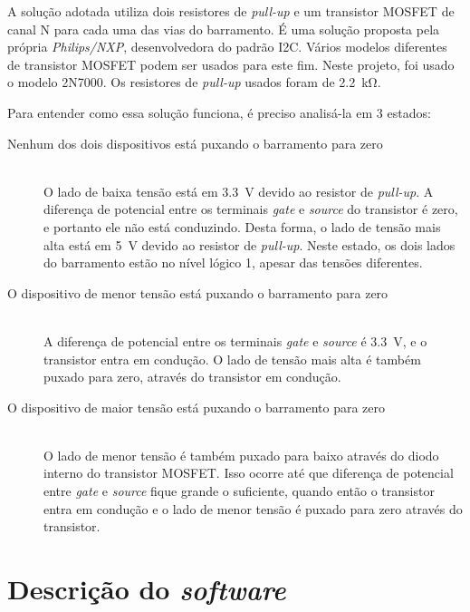 \documentclass[brazil,pagestart=firstchapter]{abnt}
\begin{document}
A solução adotada utiliza dois resistores de \textit{pull-up} e um
transistor MOSFET de canal N para cada uma das vias do barramento. É uma
solução proposta pela própria \textit{Philips/NXP}, desenvolvedora do padrão
\ac{I2C}. \cite[p.~10]{AN97055} \cite{AN10441} Vários modelos diferentes de
transistor MOSFET podem ser usados para este fim. Neste projeto, foi usado o
modelo 2N7000. Os resistores de \textit{pull-up} usados foram de
\SI{2.2}{\kilo\ohm}.

Para entender como essa solução funciona, é preciso analisá-la em 3 estados:
\cite[p.~10]{AN97055} \cite[p.~4]{AN10441}

\begin{description}
\item[Nenhum dos dois dispositivos está puxando o barramento para zero] \hfill \\
	O lado de baixa tensão está em \SI{3.3}{\volt} devido ao resistor de
	\textit{pull-up}. A diferença de potencial entre os terminais
	\textit{gate} e \textit{source} do transistor é zero, e portanto ele não
	está conduzindo. Desta forma, o lado de tensão mais alta está em
	\SI{5}{\volt} devido ao resistor de \textit{pull-up}. Neste estado, os
	dois lados do barramento estão no nível lógico 1, apesar das tensões
	diferentes.

\item[O dispositivo de menor tensão está puxando o barramento para zero] \hfill \\
	A diferença de potencial entre os terminais \textit{gate} e
	\textit{source} é \SI{3.3}{\volt}, e o transistor entra em condução. O
	lado de tensão mais alta é também puxado para zero, através do
	transistor em condução.

\item[O dispositivo de maior tensão está puxando o barramento para zero] \hfill \\
	O lado de menor tensão é também puxado para baixo através do diodo
	interno do transistor MOSFET. Isso ocorre até que diferença de potencial
	entre \textit{gate} e \textit{source} fique grande o suficiente, quando
	então o transistor entra em condução e o lado de menor tensão é puxado
	para zero através do transistor.

\end{description}


\chapter{Descrição do \textit{software}}
\label{cap:software}
\end{document}
